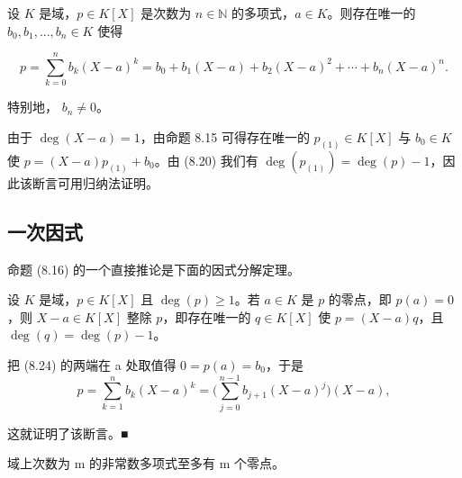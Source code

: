 \begin{proposition}

设 $K$ 是域，$p \in K[X]$ 是次数为 $n \in \mathbb{N}$ 的多项式，$a \in K$。则存在唯一的 $b_0, b_1, \ldots, b_n \in K$ 使得

\begin{equation}
p=\sum_{k=0}^{n}b_{k}(X-a)^{k}=b_{0}+b_{1}(X-a)+b_{2}(X-a)^{2}+\cdots+b_{n}(X-a)^{n}.
\end{equation}

特别地， $ b_{n} \neq 0 $。

\proofhead
由于  $ \deg(X - a) = 1 $，由命题 8.15 可得存在唯一的  $ p_{(1)} \in K[X] $ 与  $ b_0 \in K $ 使  $ p = (X - a)p_{(1)} + b_0 $。由 (8.20) 我们有  $ \deg(p_{(1)}) = \deg(p) - 1 $，因此该断言可用归纳法证明。
\end{proposition}

\subsection*{一次因式}

命题 (8.16) 的一个直接推论是下面的因式分解定理。

\begin{theorem}

设 $K$ 是域，$p \in K[X]$ 且 $\deg(p) \geq 1$。若 $a \in K$ 是 $p$ 的零点，即 $p(a) = 0$，则 $X - a \in K[X]$ 整除 $p$，即存在唯一的 $q \in K[X]$ 使 $p = (X - a)q$，且 $\deg(q) = \deg(p) - 1$。

\proofhead
把 (8.24) 的两端在 a 处取值得  $ 0 = p(a) = b_{0} $，于是
\[
p=\sum_{k=1}^{n}b_{k}(X-a)^{k}=\Big(\sum_{j=0}^{n-1}b_{j+1}(X-a)^{j}\Big)(X-a),
\]

这就证明了该断言。■

\end{theorem}

\begin{corollary}

域上次数为 m 的非常数多项式至多有 m 个零点。

\end{corollary}

